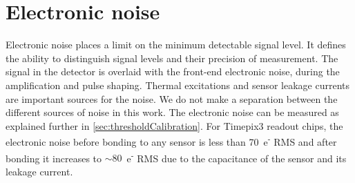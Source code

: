 \begin{table}[htbp]
  \centering
  \caption{Details of different Advacam planar pixel sensors
    bump-bonded to Timepix3 readout ASICs and studied in calibration
    and test beams.}
  \label{tab:Timepix3Assemblies}
\end{table}

\section{Electronic noise}
\label{sec:noise}

Electronic noise places a limit on the minimum detectable signal
level. It defines the ability to distinguish signal levels and their
precision of measurement. The signal in the detector is overlaid with
the front-end electronic noise, during the amplification and pulse
shaping. Thermal excitations and sensor leakage currents are important
sources for the noise. We do not make a separation between the
different sources of noise in this work. The electronic noise can be
measured as explained further in \cref{sec:thresholdCalibration}. For
Timepix3 readout chips, the electronic noise before bonding to any
sensor is less than 70~e\textsuperscript{-} RMS and after bonding it
increases to $\sim80$~e\textsuperscript{-} RMS due to the capacitance
of the sensor and its leakage current.



